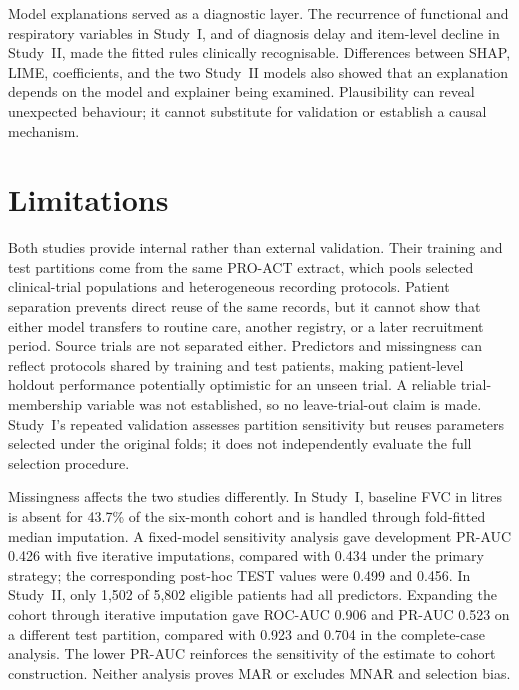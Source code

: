 Model explanations served as a diagnostic layer. The recurrence of functional and respiratory variables in Study~I, and of diagnosis delay and item-level decline in Study~II, made the fitted rules clinically recognisable. Differences between \gls{SHAP}, \gls{LIME}, coefficients, and the two Study~II models also showed that an explanation depends on the model and explainer being examined. Plausibility can reveal unexpected behaviour; it cannot substitute for validation or establish a causal mechanism.

\section{Limitations}
\label{sec:conclusion_limitations}

Both studies provide internal rather than external validation. Their training and test partitions come from the same \gls{PRO-ACT} extract, which pools selected clinical-trial populations and heterogeneous recording protocols. Patient separation prevents direct reuse of the same records, but it cannot show that either model transfers to routine care, another registry, or a later recruitment period.
Source trials are not separated either. Predictors and missingness can reflect protocols shared by training and test patients, making patient-level holdout performance potentially optimistic for an unseen trial. A reliable trial-membership variable was not established, so no leave-trial-out claim is made. Study~I's repeated validation assesses partition sensitivity but reuses parameters selected under the original folds; it does not independently evaluate the full selection procedure.

Missingness affects the two studies differently. In Study~I, baseline \gls{FVC} in litres is absent for 43.7\% of the six-month cohort and is handled through fold-fitted median imputation. A fixed-model sensitivity analysis gave development PR-AUC 0.426 with five iterative imputations, compared with 0.434 under the primary strategy; the corresponding post-hoc TEST values were 0.499 and 0.456. In Study~II, only 1,502 of 5,802 eligible patients had all predictors. Expanding the cohort through iterative imputation gave ROC-AUC 0.906 and PR-AUC 0.523 on a different test partition, compared with 0.923 and 0.704 in the complete-case analysis. The lower PR-AUC reinforces the sensitivity of the estimate to cohort construction. Neither analysis proves \gls{MAR} or excludes \gls{MNAR} and selection bias.

